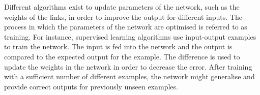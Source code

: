 Different algorithms exist to update parameters of the network, such as the weights of the
links, in order to improve the output for different inputs. The process in which the parameters of
the network are optimised is referred to as training. For instance, supervised learning algorithms use input-output
examples to train the network. The input is fed into the network and the output is compared
to the expected output for the example. The difference is used to update the weights in the network in order to decrease
the error. After training with a sufficient number of different examples, the network might generalise and provide
correct outputs for previously unseen examples.
